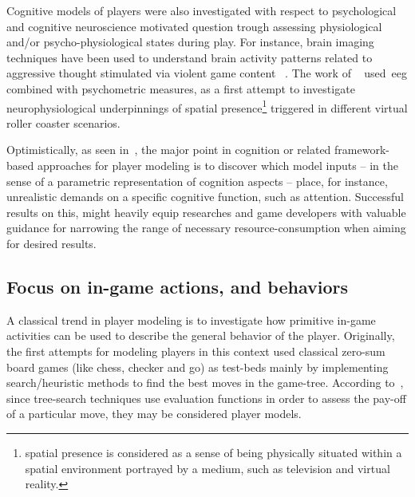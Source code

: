 Cognitive models of players were also investigated with respect to psychological and cognitive neuroscience motivated question trough assessing physiological and/or psycho-physiological states during play. For instance, brain imaging techniques have been used to understand brain activity patterns related to aggressive thought stimulated via violent game content ~\citep{weber_does_2006}. The work of ~\cite{baumgartner_neural_2006} used~\gls{eeg} combined with psychometric measures, as a first attempt to investigate neurophysiological underpinnings of spatial presence\footnote{spatial presence is considered as a sense of being physically situated within a spatial environment portrayed by a medium, such as television and virtual reality.} triggered in different virtual roller coaster scenarios.

Optimistically, as seen in~\cite{bohil_cognitive_2007}, the major point in cognition or related framework-based approaches for player modeling is to discover which model inputs -- in the sense of a parametric representation of cognition aspects -- place, for instance, unrealistic demands on a specific cognitive function, such as attention. Successful results on this, might heavily equip researches and game developers with valuable guidance for narrowing the range of necessary resource-consumption when aiming for desired results.   

\subsection{Focus on in-game actions, and behaviors}\label{sec:in_game_action_reviews}
A classical trend in player modeling is to investigate how primitive in-game activities can be used to describe the general behavior of the player. Originally, the first attempts for modeling players in this context used classical zero-sum board games (like chess, checker and go) as test-beds mainly by implementing search/heuristic methods to find the best moves in the game-tree. According to~\cite{bakkes_player_2012}, since tree-search techniques use evaluation functions in order to assess the pay-off of a particular move, they may be considered player models.

